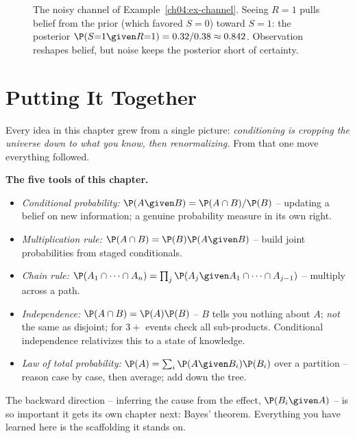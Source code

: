 \begin{figure}[H]
\centering
{}
\caption{The noisy channel of Example~\ref{ch04:ex-channel}. Seeing $R{=}1$ pulls belief from the prior (which favored $S{=}0$) toward $S{=}1$: the posterior $\P(S{=}1\given R{=}1) = 0.32/0.38 \approx 0.842$. Observation reshapes belief, but noise keeps the posterior short of certainty.}
\label{ch04:fig-channel}
\end{figure}

\section{Putting It Together}
\label{ch04:summary}

Every idea in this chapter grew from a single picture: \emph{conditioning is cropping the universe down to what you know, then renormalizing.} From that one move everything followed.

\begin{focusbox}
\textbf{The five tools of this chapter.}
\begin{itemize}
\item \emph{Conditional probability:} $\P(A\given B) = \P(A\cap B)/\P(B)$ -- updating a belief on new information; a genuine probability measure in its own right.
\item \emph{Multiplication rule:} $\P(A\cap B) = \P(B)\P(A\given B)$ -- build joint probabilities from staged conditionals.
\item \emph{Chain rule:} $\P(A_1\cap\cdots\cap A_n) = \prod_j \P(A_j \given A_1\cap\cdots\cap A_{j-1})$ -- multiply across a path.
\item \emph{Independence:} $\P(A\cap B) = \P(A)\P(B)$ -- $B$ tells you nothing about $A$; \emph{not} the same as disjoint; for $3+$ events check all sub-products. Conditional independence relativizes this to a state of knowledge.
\item \emph{Law of total probability:} $\P(A) = \sum_i \P(A\given B_i)\P(B_i)$ over a partition -- reason case by case, then average; add down the tree.
\end{itemize}
The backward direction -- inferring the cause from the effect, $\P(B_i \given A)$ -- is so important it gets its own chapter next: Bayes' theorem. Everything you have learned here is the scaffolding it stands on.
\end{focusbox}

